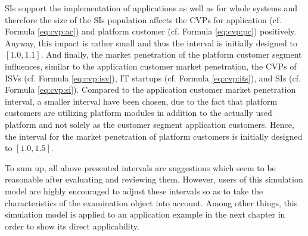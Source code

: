 \acp{SI} support the implementation of applications as well as for whole systems and therefore the size of the \acp{SI} population affects the \acp{CVP} for application (cf. Formula \ref{eq:cvp:ac}) and platform customer (cf. Formula \ref{eq:cvp:pc}) positively. Anyway, this impact is rather small and thus the interval is initially designed to $[1.0,1.1]$. And finally, the market penetration of the platform customer segment influences, similar to the application customer market penetration, the \acp{CVP} of \acp{ISV} (cf. Formula \ref{eq:cvp:isv}), \ac{IT} startups (cf. Formula \ref{eq:cvp:its}), and \acp{SI} (cf. Formula \ref{eq:cvp:si}). Compared to the application customer market penetration interval, a smaller interval have been chosen, due to the fact that platform customers are utilizing platform modules in addition to the actually used platform and not solely as the customer segment application customers. Hence, the interval for the market penetration of platform customers is initially designed to $[1.0,1.5]$.

To sum up, all above presented intervals are suggestions which seem to be reasonable after evaluating and reviewing them. However, users of this simulation model are highly encouraged to adjust these intervals so as to take the characteristics of the examination object into account. Among other things, this simulation model is applied to an application example in the next chapter in order to show its direct applicability.

